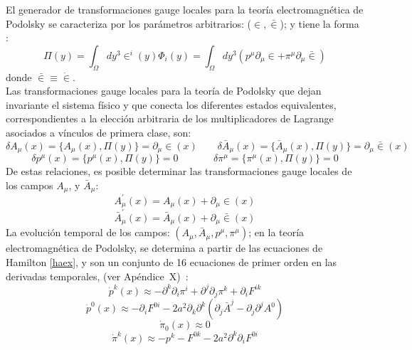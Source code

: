 \documentclass[a4paper,12pt]{article}
\begin{document}
El generador de transformaciones gauge locales para la teoría electromagnética de Podolsky se caracteriza por los parámetros arbitrarios: ($\in,\bar{\in}$); y tiene la forma \cite{podolsky}:
\begin{equation}
\Pi(y)= \int_{\Omega}dy^3\in^i(y)\Phi_i(y)=\int_{\Omega}dy^3(p^\mu\partial_{\mu}\in+\pi^\mu\partial_\mu\bar{\in}) 
\end{equation}
donde $\bar{\in}\equiv\dot\in$. 
\\

Las transformaciones gauge locales para la teoría de Podolsky que dejan invariante el sistema físico y que conecta los diferentes estados equivalentes, correspondientes a la elección arbitraria de los multiplicadores de Lagrange asociados a vínculos de primera clase, son:
\begin{equation}
\delta A_\mu(x)=\{A_\mu(x),\Pi(y)\}=\partial_{\mu}\in(x) \ \ \ \ \  \ \ \ \ \delta \bar{A}_\mu(x)=\{\bar{A}_\mu(x),\Pi(y)\}=\partial_{\mu}\bar{\in}(x)
\label{gaiapri}
\end{equation}
$$\delta p^\mu(x)=\{p^\mu(x),\Pi(y)\}=0\ \ \ \ \ \ \ \ \ \ \ \  \ \ \ \ \delta \pi^\mu=\{\pi^\mu(x),\Pi(y)\}=0$$
De estas relaciones, es posible determinar las transformaciones gauge locales de los campos $A_\mu$, y $\bar{A}_\mu$:
\begin{equation}
A_{\mu}^{'}(x)=A_{\mu}(x)+\partial_{\mu} \in(x) 
\end{equation} 
$$\bar{A}_{\mu}^{'}(x)=\bar{A}_{\mu}(x)+\partial_{\mu} \bar{\in}(x) $$
La evolución temporal de los campos: \mbox{$(A_\mu,\bar{A}_\mu,p^\mu,\pi^\mu)$}; en la teoría electromagnética de Podolsky, se determina a partir de las ecuaciones de Hamilton \eqref{haex}, y son un conjunto de 16 ecuaciones de primer orden en las derivadas temporales, (ver \mbox{Apéndice X) \cite{podolsky,forhaljdpo}:}
\begin{equation}
\dot p^{k}(x)\approx-\partial^k\partial_i\pi^{i}+\partial^j\partial_j\pi^{k}+\partial_iF^{ik}
\label{haecude}
\end{equation}
\begin{equation}
\dot p^{0}(x)\approx-\partial_iF^{0i}-2a^2\partial_k\partial^k(\partial_j\bar{A}^j-\partial_j\partial^jA^0) 
\end{equation}
\begin{equation}
\dot \pi_{0}(x)\approx0 
\end{equation}
\begin{equation}
\dot \pi^{k}(x)\approx-p^{k}-F^{0k}-2a^2\partial^k\partial_i F^{0i} 
\end{equation}
\end{document}
